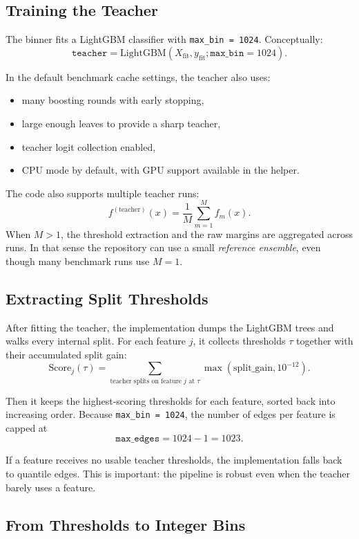 \documentclass[11pt]{article}
\begin{document}
\subsection{Training the Teacher}

The binner fits a LightGBM classifier with \texttt{max\_bin = 1024}. Conceptually:
\[
\texttt{teacher} = \mathrm{LightGBM}(X_{\mathrm{fit}}, y_{\mathrm{fit}}; \texttt{max\_bin}=1024).
\]

In the default benchmark cache settings, the teacher also uses:

\begin{itemize}
\item many boosting rounds with early stopping,
\item large enough leaves to provide a sharp teacher,
\item teacher logit collection enabled,
\item CPU mode by default, with GPU support available in the helper.
\end{itemize}

The code also supports multiple teacher runs:
\[
f^{(\mathrm{teacher})}(x) = \frac{1}{M} \sum_{m=1}^M f_m(x).
\]
When \(M > 1\), the threshold extraction and the raw margins are aggregated across runs. In that sense the repository can use a small \emph{reference ensemble}, even though many benchmark runs use \(M = 1\).

\subsection{Extracting Split Thresholds}

After fitting the teacher, the implementation dumps the LightGBM trees and walks every internal split. For each feature \(j\), it collects thresholds \(\tau\) together with their accumulated split gain:
\[
\mathrm{Score}_j(\tau) = \sum_{\text{teacher splits on feature } j \text{ at } \tau} \max(\mathrm{split\_gain}, 10^{-12}).
\]

Then it keeps the highest-scoring thresholds for each feature, sorted back into increasing order. Because \texttt{max\_bin = 1024}, the number of edges per feature is capped at
\[
\texttt{max\_edges} = 1024 - 1 = 1023.
\]

If a feature receives no usable teacher thresholds, the implementation falls back to quantile edges. This is important: the pipeline is robust even when the teacher barely uses a feature.

\subsection{From Thresholds to Integer Bins}
\end{document}
